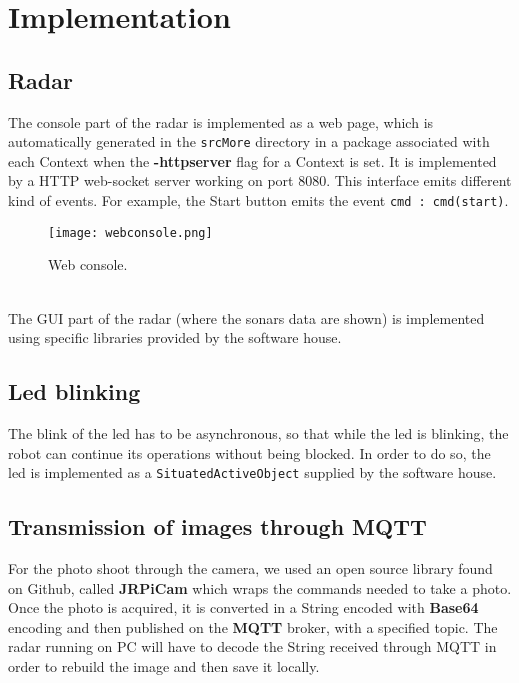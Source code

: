 \section{Implementation}
\subsection{Radar}
The console part of the radar is implemented as a web page, which is automatically generated in the \lstinline[columns=fixed]{srcMore} directory in a package associated with each Context when the \textbf{-httpserver} flag for a Context is set. It is implemented by a HTTP web-socket server working on port 8080. This interface emits different kind of events. For example, the Start button emits the event  \lstinline[columns=fixed]{cmd : cmd(start)}.
\begin{figure}[h]
	\centering
	\texttt{[image: webconsole.png]}
	\caption{Web console.}
\end{figure}
\\
The GUI part of the radar (where the sonars data are shown) is implemented using specific libraries provided by the software house.
\subsection{Led blinking}
The blink of the led has to be asynchronous, so that while the led is blinking, the robot can continue its operations without being blocked. In order to do so, the led is implemented as a \lstinline[columns=fixed]{SituatedActiveObject} supplied by the software house.

\subsection{Transmission of images through MQTT}
For the photo shoot through the camera, we used an open source library found on Github, called \textbf{JRPiCam} which wraps the commands needed to take a photo. Once the photo is acquired, it is converted in a String encoded with \textbf{Base64} encoding and then published on the \textbf{MQTT} broker, with a specified topic. The radar running on PC will have to decode the String received through MQTT in order to rebuild the image and then save it locally.

